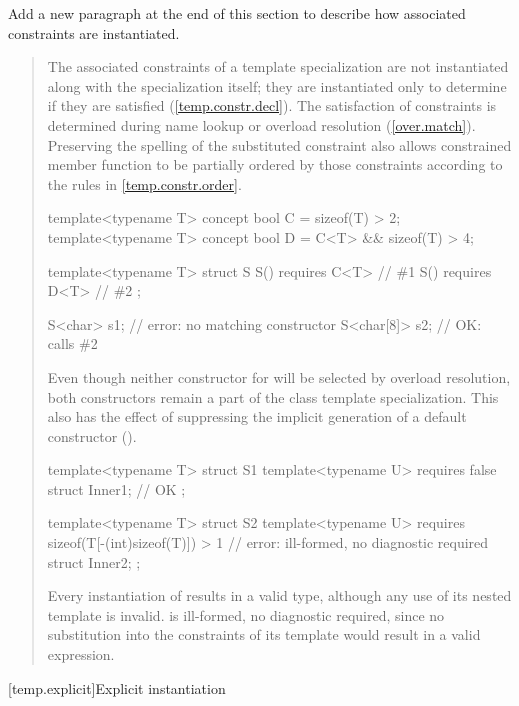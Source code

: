Add a new paragraph at the end of this section to describe how associated
constraints are instantiated.

\begin{quote}
\begin{addedblock}
\setcounter{Paras}{15}
\pnum
The associated constraints of a template specialization are not
instantiated along with the specialization itself; they are
instantiated only to determine if they are satisfied
(\ref{temp.constr.decl}).
% 
\enternote
The satisfaction of constraints is determined during name lookup or overload
resolution (\ref{over.match}). Preserving the spelling
of the substituted constraint also allows constrained member function
to be partially ordered by those constraints according to the rules
in \ref{temp.constr.order}.
\exitnote
% 
\enterexample
\begin{codeblock}
template<typename T> concept bool C = sizeof(T) > 2;
template<typename T> concept bool D = C<T> && sizeof(T) > 4;

template<typename T> struct S {
  S() requires C<T> { } // \#1
  S() requires D<T> { } // \#2
};

S<char> s1;    // error: no matching constructor
S<char[8]> s2; // OK: calls \#2
\end{codeblock}

Even though neither constructor for  will be selected by
overload resolution, both constructors remain a part of the class template 
specialization. 
% 
This also has the effect of suppressing the implicit generation of a default
constructor ().
\exitexample
% 
\enterexample
\begin{codeblock}
template<typename T> struct S1 {
  template<typename U> requires false struct Inner1; // OK
};

template<typename T> struct S2 {
  template<typename U> 
    requires sizeof(T[-(int)sizeof(T)]) > 1 // error: ill-formed, no diagnostic required
      struct Inner2;
};
\end{codeblock}
\exitexample
Every instantiation of  results in a valid type, although any use 
of its nested  template is invalid.
% 
 is ill-formed, no diagnostic required, since no substitution into 
the constraints of its  template would result in a valid 
expression.
\end{addedblock}
\end{quote}


[temp.explicit]{Explicit instantiation}


